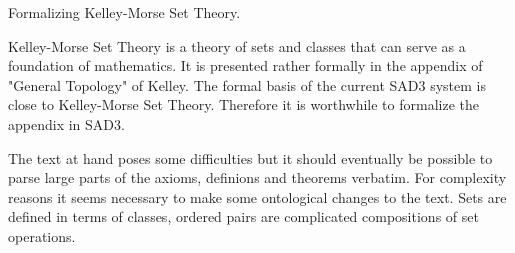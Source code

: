 Formalizing Kelley-Morse Set Theory.

Kelley-Morse Set Theory is a theory of sets and classes that can 
serve as a foundation of mathematics. It is presented rather formally
in the appendix of "General Topology" of Kelley. The formal
basis of the current SAD3 system is close to Kelley-Morse Set Theory.
Therefore it is worthwhile to formalize the appendix in SAD3.

The text at hand poses some difficulties but it should eventually be
possible to parse large parts of the axioms, definions and theorems
verbatim. For complexity reasons it seems necessary to make some
ontological changes to the text. Sets are defined in terms of classes,
ordered pairs are complicated compositions of set operations.

